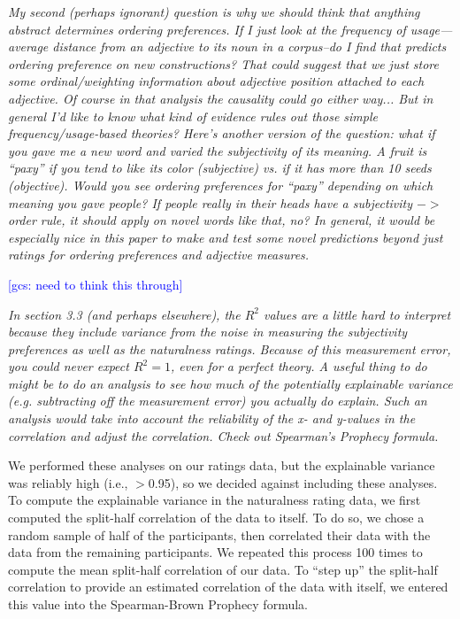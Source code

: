 \documentclass[12pt]{article}
\newcommand{\gcs}[1]{\textcolor{blue}{[gcs: #1]}}
\begin{document}
\item \emph{My second (perhaps ignorant) question is why we should think that anything abstract determines ordering preferences. If I just look at the frequency of usage---average distance from an adjective to its noun in a corpus--do I find that predicts ordering preference on new constructions? That could suggest that we just store some ordinal/weighting information about adjective position attached to each adjective. Of course in that analysis the causality could go either way... But in general I'd like to know what kind of evidence rules out those simple frequency/usage-based theories? Here's another version of the question: what if you gave me a new word and varied the subjectivity of its meaning. A fruit is ``paxy'' if you tend to like its color (subjective) vs. if it has more than 10 seeds (objective). Would you see ordering preferences for ``paxy'' depending on which meaning you gave people? If people really in their heads have a subjectivity $->$ order rule, it should apply on novel
words like that, no? In general, it would be especially nice in this paper to make and test some novel predictions beyond just ratings for ordering preferences and adjective measures.}

\gcs{need to think this through}

\item \emph{In section 3.3 (and perhaps elsewhere), the $R^2$ values are a little hard to interpret because they include variance from the noise in measuring the subjectivity preferences as well as the naturalness ratings. Because of this measurement error, you could never expect $R^2=1$, even for a perfect theory. A useful thing to do might be to do an analysis to see how much of the potentially explainable variance (e.g. subtracting off the measurement error) you actually do explain. Such an analysis would take into account the reliability of the x- and y-values in the correlation and adjust the correlation. Check out Spearman's Prophecy formula.}

We performed these analyses on our ratings data, but the explainable variance was reliably high (i.e., $>$0.95), so we decided against including these analyses. To compute the explainable variance in the naturalness rating data, we first computed the split-half correlation of the data to itself. To do so, we chose a random sample of half of the participants, then correlated their data with the data from the remaining participants. We repeated this process 100 times to compute the mean split-half correlation of our data. To ``step up'' the split-half correlation to provide an estimated correlation of the data with itself, we entered this value into the Spearman-Brown Prophecy formula.
\end{document}
